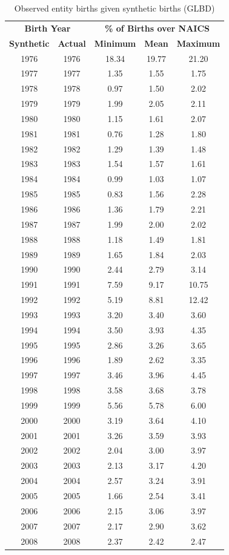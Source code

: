 \begin{table}[H]
\centering\footnotesize
\caption{Observed entity births given synthetic births (GLBD)} \label{tab:GLBD:Probability} \medskip
\renewcommand{\arraystretch}{1}
\begin{tabular}{c c| c c c}
\toprule
\multicolumn{2}{c|}{\textbf{Birth Year}} &  \multicolumn{3}{c}{\textbf{\% of Births over NAICS}}\\
\textbf{Synthetic}&\textbf{Actual}&\textbf{Minimum}&\textbf{Mean}&\textbf{Maximum}\\
\midrule
1976&1976&18.34&19.77&21.20\\
1977&1977&1.35&1.55&1.75\\
1978&1978&0.97&1.50&2.02\\
1979&1979&1.99&2.05&2.11\\
1980&1980&1.15&1.61&2.07\\
1981&1981&0.76&1.28&1.80\\
1982&1982&1.29&1.39&1.48\\
1983&1983&1.54&1.57&1.61\\
1984&1984&0.99&1.03&1.07\\
1985&1985&0.83&1.56&2.28\\
1986&1986&1.36&1.79&2.21\\
1987&1987&1.99&2.00&2.02\\
1988&1988&1.18&1.49&1.81\\
1989&1989&1.65&1.84&2.03\\
1990&1990&2.44&2.79&3.14\\
1991&1991&7.59&9.17&10.75\\
1992&1992&5.19&8.81&12.42\\
1993&1993&3.20&3.40&3.60\\
1994&1994&3.50&3.93&4.35\\
1995&1995&2.86&3.26&3.65\\
1996&1996&1.89&2.62&3.35\\
1997&1997&3.46&3.96&4.45\\
1998&1998&3.58&3.68&3.78\\
1999&1999&5.56&5.78&6.00\\
2000&2000&3.19&3.64&4.10\\
2001&2001&3.26&3.59&3.93\\
2002&2002&2.04&3.00&3.97\\
2003&2003&2.13&3.17&4.20\\
2004&2004&2.57&3.24&3.91\\
2005&2005&1.66&2.54&3.41\\
2006&2006&2.15&3.06&3.97\\
2007&2007&2.17&2.90&3.62\\
2008&2008&2.37&2.42&2.47\\
 \bottomrule
\end{tabular} 
\\
\justify
\end{table}
